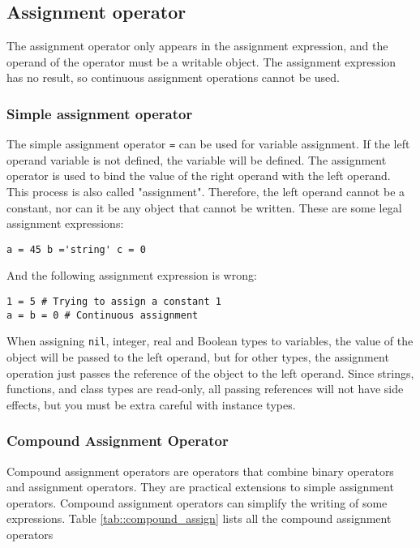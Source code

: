 \subsection {Assignment operator} \label{section::assign_operator}

The assignment operator only appears in the assignment expression, and the operand of the operator must be a writable object. The assignment expression has no result, so continuous assignment operations cannot be used.

\subsubsection {Simple assignment operator}

The simple assignment operator \texttt{=} can be used for variable assignment. If the left operand variable is not defined, the variable will be defined. The assignment operator is used to bind the value of the right operand with the left operand. This process is also called "assignment". Therefore, the left operand cannot be a constant, nor can it be any object that cannot be written. These are some legal assignment expressions:
\begin{lstlisting}[language=berry, numbers=none]
a = 45 b ='string' c = 0
\end{lstlisting}
And the following assignment expression is wrong:
\begin{lstlisting}[language=berry, numbers=none]
1 = 5 # Trying to assign a constant 1
a = b = 0 # Continuous assignment
\end{lstlisting}

When assigning \texttt{nil}, integer, real and Boolean types to variables, the value of the object will be passed to the left operand, but for other types, the assignment operation just passes the reference of the object to the left operand. Since strings, functions, and class types are read-only, all passing references will not have side effects, but you must be extra careful with instance types.

\subsubsection {Compound Assignment Operator}

Compound assignment operators are operators that combine binary operators and assignment operators. They are practical extensions to simple assignment operators. Compound assignment operators can simplify the writing of some expressions. Table \ref{tab::compound_assign} lists all the compound assignment operators

